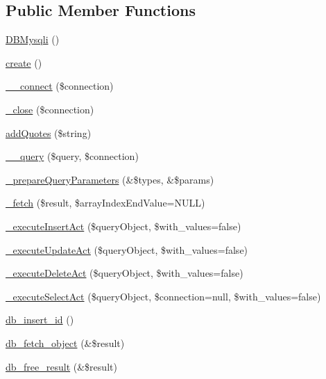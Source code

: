 \subsection*{Public Member Functions}
\begin{DoxyCompactItemize}
\item 
\hyperlink{classDBMysqli_a907425710f00306d10897cb1f76719ca}{D\+B\+Mysqli} ()
\item 
\hyperlink{classDBMysqli_a589dd45054eb50e666c3a57815631111}{create} ()
\item 
\hyperlink{classDBMysqli_a7c041395f7926e0ec84186aa9eabc138}{\+\_\+\+\_\+connect} (\$connection)
\item 
\hyperlink{classDBMysqli_afd6324d65eaf95dbd8e6fa2f97b9b9db}{\+\_\+close} (\$connection)
\item 
\hyperlink{classDBMysqli_a29266a97d63be11763eb24926d39f544}{add\+Quotes} (\$string)
\item 
\hyperlink{classDBMysqli_aa7e47178c283abd8ba1bb7c8d0a31c66}{\+\_\+\+\_\+query} (\$query, \$connection)
\item 
\hyperlink{classDBMysqli_ab884208e90c71708faca2e56c5da0666}{\+\_\+prepare\+Query\+Parameters} (\&\$types, \&\$params)
\item 
\hyperlink{classDBMysqli_a4b5becb1ab24b99a184fe1942bc73280}{\+\_\+fetch} (\$result, \$array\+Index\+End\+Value=N\+U\+L\+L)
\item 
\hyperlink{classDBMysqli_a6a62a12cd9c46aac0242e81f58a25803}{\+\_\+execute\+Insert\+Act} (\$query\+Object, \$with\+\_\+values=false)
\item 
\hyperlink{classDBMysqli_acc5f5408c3717c88411a238e1e176785}{\+\_\+execute\+Update\+Act} (\$query\+Object, \$with\+\_\+values=false)
\item 
\hyperlink{classDBMysqli_a3dc572c5b452c7a2e0e150f6b8af622e}{\+\_\+execute\+Delete\+Act} (\$query\+Object, \$with\+\_\+values=false)
\item 
\hyperlink{classDBMysqli_a76e3f67b339c7613ad1d6e33af04e51e}{\+\_\+execute\+Select\+Act} (\$query\+Object, \$connection=null, \$with\+\_\+values=false)
\item 
\hyperlink{classDBMysqli_a080939c13758f00ecd0092eda6cd2452}{db\+\_\+insert\+\_\+id} ()
\item 
\hyperlink{classDBMysqli_a9e173fea0afa5c419977be95d1859892}{db\+\_\+fetch\+\_\+object} (\&\$result)
\item 
\hyperlink{classDBMysqli_a8639ebaca8bae119797a084af68750cc}{db\+\_\+free\+\_\+result} (\&\$result)
\end{DoxyCompactItemize}
